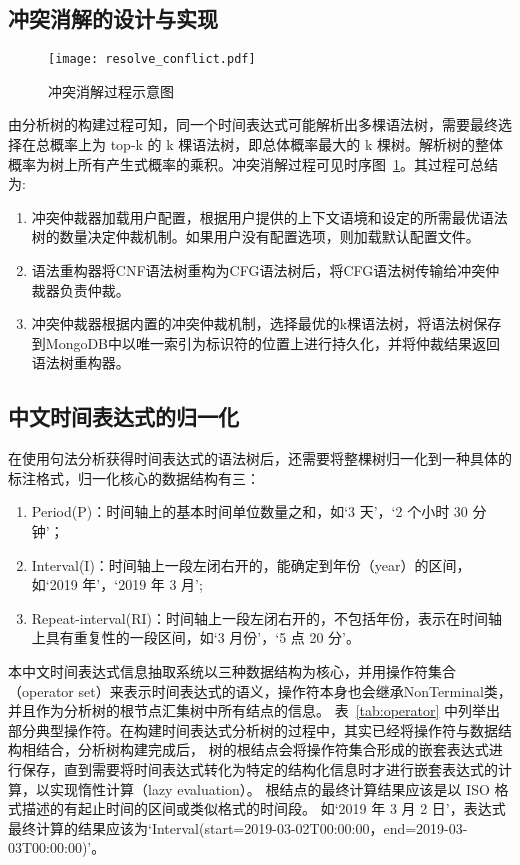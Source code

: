 \subsection{冲突消解的设计与实现}

\begin{figure}[b]
    \centering
    \texttt{[image: resolve\_conflict.pdf]}
    \caption{冲突消解过程示意图}
    \label{fig:conflict_resolution}
\end{figure}

由分析树的构建过程可知，同一个时间表达式可能解析出多棵语法树，需要最终选择在总概率上为 top-k 的
k 棵语法树，即总体概率最大的 k 棵树。解析树的整体概率为树上所有产生式概率的乘积。冲突消解过程可见时序图~\ref{fig:conflict_resolution}。其过程可总结为: 

\begin{enumerate}
    \item[(1)] 冲突仲裁器加载用户配置，根据用户提供的上下文语境和设定的所需最优语法树的数量决定仲裁机制。如果用户没有配置选项，则加载默认配置文件。
    \item[(2)] 语法重构器将CNF语法树重构为CFG语法树后，将CFG语法树传输给冲突仲裁器负责仲裁。
    \item[(3)] 冲突仲裁器根据内置的冲突仲裁机制，选择最优的k棵语法树，将语法树保存到MongoDB中以唯一索引为标识符的位置上进行持久化，并将仲裁结果返回语法树重构器。
\end{enumerate}

\subsection{中文时间表达式的归一化}

在使用句法分析获得时间表达式的语法树后，还需要将整棵树归一化到一种具体的标注格式，归一化核心的数据结构有三：
\begin{enumerate}
    \item[(1)] Period(P)：时间轴上的基本时间单位数量之和，如‘3 天’，‘2 个小时 30 分钟’；
    \item[(2)] Interval(I)：时间轴上一段左闭右开的，能确定到年份（year）的区间，如‘2019 年’，‘2019 年 3 月’;
    \item[(3)] Repeat-interval(RI)：时间轴上一段左闭右开的，不包括年份，表示在时间轴上具有重复性的一段区间，如‘3 月份’，‘5 点 20 分’。
\end{enumerate}

本中文时间表达式信息抽取系统以三种数据结构为核心，并用操作符集合（operator set）来表示时间表达式的语义，操作符本身也会继承NonTerminal类，并且作为分析树的根节点汇集树中所有结点的信息。
表~\ref{tab:operator} 中列举出部分典型操作符。在构建时间表达式分析树的过程中，其实已经将操作符与数据结构相结合，分析树构建完成后，
树的根结点会将操作符集合形成的嵌套表达式进行保存，直到需要将时间表达式转化为特定的结构化信息时才进行嵌套表达式的计算，以实现惰性计算（lazy evaluation）。
根结点的最终计算结果应该是以 ISO 格式描述的有起止时间的区间或类似格式的时间段。
如‘2019 年 3 月 2 日’，表达式最终计算的结果应该为‘Interval(start=2019-03-02T00:00:00，end=2019-03-03T00:00:00)’。

